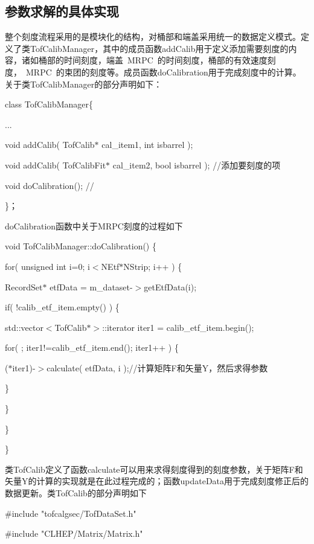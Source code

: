 \subsection{参数求解的具体实现}
整个刻度流程采用的是模块化的结构，对桶部和端盖采用统一的数据定义模式。定义了类TofCalibManager，其中的成员函数addCalib用于定义添加需要刻度的内容，诸如桶部的时间刻度，端盖~MRPC~的时间刻度，桶部的有效速度刻度，~MRPC~的束团的刻度等。成员函数doCalibration用于完成刻度中的计算。关于类TofCalibManager的部分声明如下：

class TofCalibManager\{

  \quad\quad  ...

  \quad\quad void addCalib( TofCalib$*$    cal\_item1, int isbarrel );

  \quad\quad void addCalib( TofCalibFit$*$ cal\_item2, bool isbarrel );  //添加要刻度的项
  
  \quad\quad void doCalibration();                                     //

\}；

doCalibration函数中关于MRPC刻度的过程如下

void TofCalibManager::doCalibration() \{

 \quad\quad  for( unsigned int i=0; i$<$NEtf$*$NStrip; i++ ) \{

 \quad\quad\quad       RecordSet$*$ etfData = m\_dataset-$>$getEtfData(i);

 \quad\quad\quad\quad        if( !calib\_etf\_item.empty() ) \{

 \quad\quad\quad\quad\quad       std::vector$<$TofCalib$*>$::iterator iter1 = calib\_etf\_item.begin();

 \quad\quad\quad\quad\quad       for( ; iter1!=calib\_etf\_item.end(); iter1++ ) \{

 \quad\quad\quad\quad\quad\quad        ($*$iter1)-$>$calculate( etfData, i );//计算矩阵F和矢量Y，然后求得参数

 \quad\quad\quad\quad\quad       \}

 \quad\quad\quad\quad      \}

\quad\quad   \}

\}

类TofCalib定义了函数calculate可以用来求得刻度得到的刻度参数，关于矩阵F和矢量Y的计算的实现就是在此过程完成的；函数updateData用于完成刻度修正后的数据更新。类TofCalib的部分声明如下

\#include "tofcalgsec/TofDataSet.h"

\#include "CLHEP/Matrix/Matrix.h"

